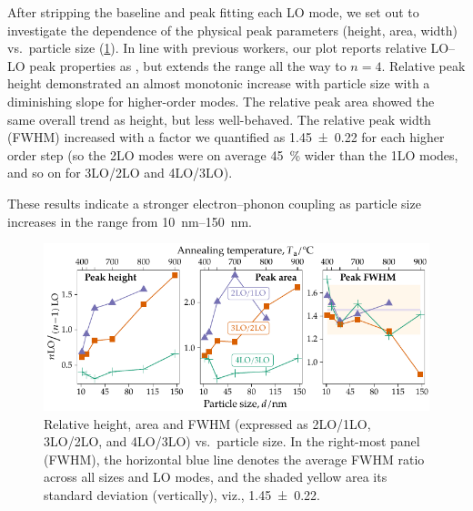 \documentclass[draft,webedition,openright,titles,swedish,english]{LuaUUThesis}\usepackage[]{graphicx}\usepackage[]{xcolor}
\newenvironment{knitrout}{}{} %
\newcommand{\viz}{viz.}
\newcommand{\vs}{vs.}
\begin{document}
After stripping the baseline and peak fitting each LO mode, we set out to
investigate the dependence of the physical peak parameters (height, area, width)
\vs\ particle size (\cref{fig:P25-UVRaman-heightLOLO-areaLOLO-fwhmLOLO-vs-diameter}).
In line with previous workers, our plot reports relative LO--LO peak properties
as  \cite{Cheng2006,Fan2012,Gandhi2018,Ojha2014,Shinde2010,Wang2004a,Hsieh2005}, but extends the range all the way to $n=4$.
Relative peak height demonstrated an almost monotonic increase with particle size
with a diminishing slope for higher-order modes.
The relative peak area showed the same overall trend as height, but less well-behaved.
The relative peak width (\gls{FWHM}) increased with a factor we quantified as
\num{1.45+-0.22} for each higher order step (so the 2LO modes were on average
\qty{45}{\percent} wider than the 1LO modes, and so on for 3LO/2LO and 4LO/3LO).

These results indicate a stronger electron--phonon coupling as particle size increases
in the range from \qtyrange{10}{150}{\nm}.


\begin{figure}[tbp]
\centering
\begin{knitrout}\scriptsize
{}\color{fgcolor}

{\centering \includegraphics[width=4.72in]{figure/0525P-fig-UVRaman-heightLOLO-areaLOLO-fwhmLOLO-vs-diameter-1} 

}


\end{knitrout}
\caption[Relative peak parameters \vs\ particle size for \ZnO]{%
   Relative height, area and \protect\gls{FWHM} (expressed as 2LO/1LO, 3LO/2LO, and 4LO/3LO)
   \vs\ particle size.
   In the right-most panel (\protect\gls{FWHM}), the horizontal blue line denotes the
   average \protect\gls{FWHM} ratio across all sizes and LO modes, and the shaded
   yellow area its standard deviation (vertically), \viz, \num{1.45+-0.22}.}
\label{fig:P25-UVRaman-heightLOLO-areaLOLO-fwhmLOLO-vs-diameter}
\end{figure}
\end{document}
